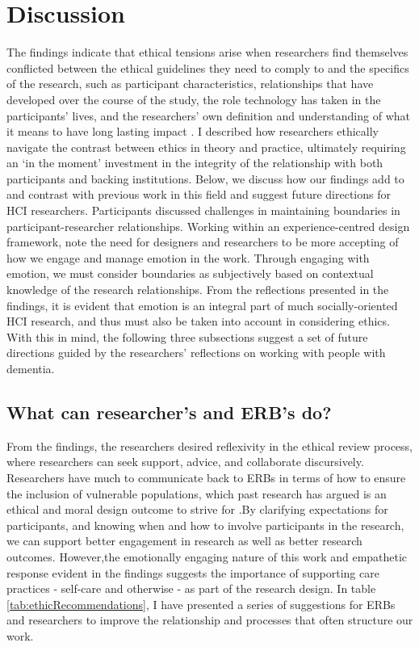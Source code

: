 \section{Discussion}
\label{Ethics:Discussion}
The findings indicate that ethical tensions arise when researchers find themselves conflicted between the ethical guidelines they need to comply to and the specifics of the research, such as participant characteristics, relationships that have developed over the course of the study, the role technology has taken in the participants’ lives, and the researchers’ own definition and understanding of what it means to have long lasting impact \citep{mattsson_praxisrelated_2007}. I described how researchers ethically navigate the contrast between ethics in theory and practice, ultimately requiring an ‘in the moment’ investment in the integrity of the relationship with both participants and backing institutions. Below, we discuss how our findings add to and contrast with previous work in this field and suggest future directions for HCI researchers.
Participants discussed challenges in maintaining boundaries in participant-researcher relationships. Working within an experience-centred design framework, \cite{balaam_emotion_2019} note the need for designers and researchers to be more accepting of how we engage and manage emotion in the work. Through engaging with emotion, we must consider boundaries as subjectively based on contextual knowledge of the research relationships. From the reflections presented in the findings, it is evident that emotion is an integral part of much socially-oriented HCI research, and thus must also be taken into account in considering ethics. With this in mind, the following three subsections suggest a set of future directions guided by the researchers' reflections on working with people with dementia.  

\subsection{What can researcher's and ERB's do?}
\label{Ethics:WhatCanWeDo}
From the findings, the researchers desired reflexivity in the ethical review process, where researchers can seek support, advice, and collaborate discursively. Researchers have much to communicate back to ERBs in terms of how to ensure the inclusion of vulnerable populations, which past research has argued is an ethical and moral design outcome to strive for \citep{scanlon_what_1998}.By clarifying expectations for participants, and knowing when and how to involve participants in the research, we can support better engagement in research as well as better research outcomes. However,the emotionally engaging nature of this work and empathetic response evident in the findings suggests the importance of supporting care practices - self-care and otherwise - as part of the research design. In table \ref{tab:ethicRecommendations}, I have presented a series of suggestions for ERBs and researchers to improve the relationship and processes that often structure our work.


